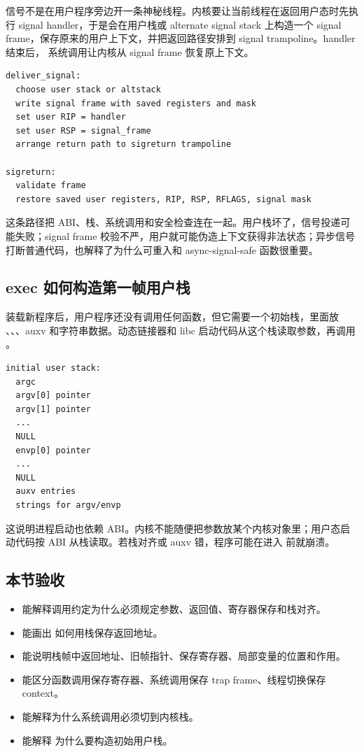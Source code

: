 信号不是在用户程序旁边开一条神秘线程。内核要让当前线程在返回用户态时先执行 signal handler，于是会在用户栈或 alternate signal stack 上构造一个 signal frame，保存原来的用户上下文，并把返回路径安排到 signal trampoline。handler 结束后， 系统调用让内核从 signal frame 恢复原上下文。

\begin{lstlisting}
deliver_signal:
  choose user stack or altstack
  write signal frame with saved registers and mask
  set user RIP = handler
  set user RSP = signal_frame
  arrange return path to sigreturn trampoline

sigreturn:
  validate frame
  restore saved user registers, RIP, RSP, RFLAGS, signal mask
\end{lstlisting}

这条路径把 ABI、栈、系统调用和安全检查连在一起。用户栈坏了，信号投递可能失败；signal frame 校验不严，用户就可能伪造上下文获得非法状态；异步信号打断普通代码，也解释了为什么可重入和 async-signal-safe 函数很重要。

\subsection{exec 如何构造第一帧用户栈}

 装载新程序后，用户程序还没有调用任何函数，但它需要一个初始栈，里面放 、、、auxv 和字符串数据。动态链接器和 libc 启动代码从这个栈读取参数，再调用 。

\begin{lstlisting}
initial user stack:
  argc
  argv[0] pointer
  argv[1] pointer
  ...
  NULL
  envp[0] pointer
  ...
  NULL
  auxv entries
  strings for argv/envp
\end{lstlisting}

这说明进程启动也依赖 ABI。内核不能随便把参数放某个内核对象里；用户态启动代码按 ABI 从栈读取。若栈对齐或 auxv 错，程序可能在进入  前就崩溃。

\subsection{本节验收}

\begin{rubricbox}
\begin{itemize}
\tightlist
\item 能解释调用约定为什么必须规定参数、返回值、寄存器保存和栈对齐。
\item 能画出  如何用栈保存返回地址。
\item 能说明栈帧中返回地址、旧帧指针、保存寄存器、局部变量的位置和作用。
\item 能区分函数调用保存寄存器、系统调用保存 trap frame、线程切换保存 context。
\item 能解释为什么系统调用必须切到内核栈。
\item 能解释  为什么要构造初始用户栈。
\end{itemize}
\end{rubricbox}
